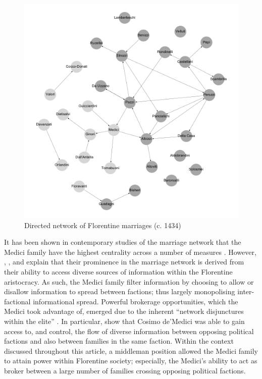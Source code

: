 \documentclass[11pt,fleqn]{article}
\begin{document}
\begin{figure}[h]
\centering
\includegraphics[scale=0.37]{Images/Florentine-marr.png}
\caption{Directed network of Florentine marriages (c. 1434)}
\label{Fig:FlorentineFamilies}
\end{figure}

It has been shown in contemporary studies of the marriage network that the Medici family have the highest centrality across a number of measures \citep[Chapter 2]{Jackson2008}. However, \citet{Roover1963}, \citet{Padgett1994}, and \citet{Goldthwaite2009} explain that their prominence in the marriage network is derived from their ability to access diverse sources of information within the Florentine aristocracy. As such, the Medici family filter information by choosing to allow or disallow information to spread between factions; thus largely monopolising inter-factional informational spread. Powerful brokerage opportunities, which the Medici took advantage of, emerged due to the inherent ``network disjunctures within the elite'' \citep[p.~1259]{Padgett1993}. In particular, \citet{Padgett1993} show that Cosimo de'Medici was able to gain access to, and control, the flow of diverse information between opposing political factions and also between families in the same faction. Within the context discussed throughout this article, a middleman position allowed the Medici family to attain power within Florentine society; especially, the Medici's ability to act as broker between a large number of families crossing opposing political factions.
\end{document}
